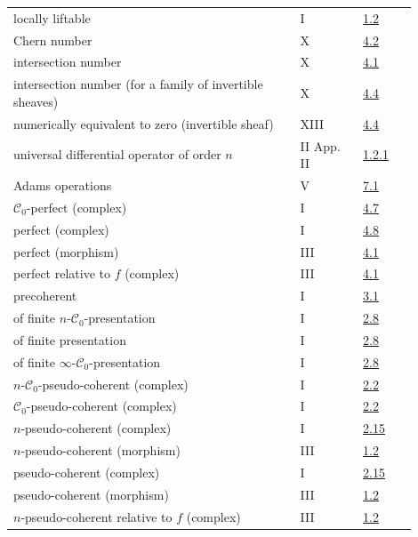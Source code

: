 \begin{longtable}{@{}>{\raggedright\arraybackslash}p{0.64\linewidth}>{\raggedright\arraybackslash}p{0.14\linewidth}>{\raggedright\arraybackslash}p{0.12\linewidth}@{}}
locally liftable & I & \hyperlink{sga6.e01.sec.1.2}{1.2}\\
Chern number & X & \hyperlink{sga6.e10.ex.4-2}{4.2}\\
intersection number & X & \hyperlink{sga6.e10.sec.4.1}{4.1}\\
intersection number (for a family of invertible sheaves) & X & \hyperlink{sga6.e10.sec.4.4}{4.4}\\
numerically equivalent to zero (invertible sheaf) & XIII & \hyperlink{sga6.e13.para.4-4}{4.4}\\
universal differential operator of order \(n\) & II App. II & \hyperlink{sga6.e02.para.1-2-1}{1.2.1}\\
Adams operations & V & \hyperlink{sga6.e05.para.7-1}{7.1}\\
\(\mathcal C_0\)-perfect (complex) & I & \hyperlink{sga6.e01.def.4-7}{4.7}\\
perfect (complex) & I & \hyperlink{sga6.e01.ex.4-8}{4.8}\\
perfect (morphism) & III & \hyperlink{sga6.e03.def.4-1}{4.1}\\
perfect relative to \(f\) (complex) & III & \hyperlink{sga6.e03.def.4-1}{4.1}\\
precoherent & I & \hyperlink{sga6.e01.def.3-1}{3.1}\\
of finite \(n\)-\(\mathcal C_0\)-presentation & I & \hyperlink{sga6.e01.def.2-8}{2.8}\\
of finite presentation & I & \hyperlink{sga6.e01.def.2-8}{2.8}\\
of finite \(\infty\)-\(\mathcal C_0\)-presentation & I & \hyperlink{sga6.e01.def.2-8}{2.8}\\
\(n\)-\(\mathcal C_0\)-pseudo-coherent (complex) & I & \hyperlink{sga6.e01.prop.2-2}{2.2}\\
\(\mathcal C_0\)-pseudo-coherent (complex) & I & \hyperlink{sga6.e01.prop.2-2}{2.2}\\
\(n\)-pseudo-coherent (complex) & I & \hyperlink{sga6.e01.ex.2-15}{2.15}\\
\(n\)-pseudo-coherent (morphism) & III & \hyperlink{sga6.e03.def.1-2}{1.2}\\
pseudo-coherent (complex) & I & \hyperlink{sga6.e01.ex.2-15}{2.15}\\
pseudo-coherent (morphism) & III & \hyperlink{sga6.e03.def.1-2}{1.2}\\
\(n\)-pseudo-coherent relative to \(f\) (complex) & III & \hyperlink{sga6.e03.def.1-2}{1.2}\\

\end{longtable}
